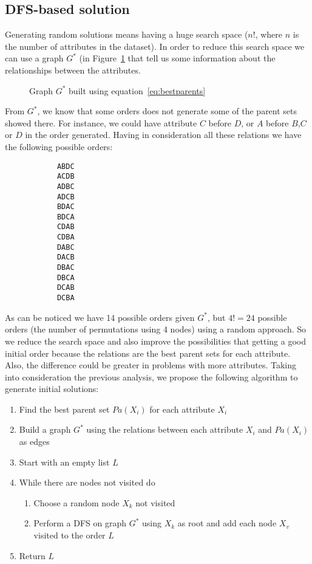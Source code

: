 \subsection{DFS-based solution}
\label{subsec:dfsapproach}
	Generating random solutions means having a huge search space ($n!$, where $n$ is the number of attributes in the dataset). In order to reduce this search space we can use a graph $G^*$ (in Figure~\ref{fig:example} that tell us some information about the relationships between the attributes.
	\begin{figure}[H]
		\centering
		
		\caption{Graph $G^*$ built using equation~\ref{eq:bestparents} }
		\label{fig:example}
	\end{figure}
	From $G^*$, we know that some orders does not generate some of the parent sets showed there. For instance, we could have attribute $C$ before $D$, or $A$ before $B$,$C$ or $D$ in the order generated. Having in consideration all these relations we have the following possible orders:
	\begin{multicols}{7}
		\begin{verbatim}
			ABDC
			ACDB
			ADBC
			ADCB
			BDAC
			BDCA
			CDAB
			CDBA
			DABC
			DACB
			DBAC
			DBCA
			DCAB
			DCBA
		\end{verbatim}
	\end{multicols}
	As can be noticed we have 14 possible orders given $G^*$, but $4! = 24$ possible orders (the number of permutations using 4 nodes) using a random approach. So we reduce the search space and also improve the possibilities that getting a good initial order because the relations are the best parent sets for each attribute. Also, the difference could be greater in problems with more attributes.
	Taking into consideration the previous analysis, we propose the following algorithm to generate initial solutions:
	\begin{enumerate}
		\item Find the best parent set ${Pa}( X_i )$ for each attribute $X_i$
		\item Build a graph $G^*$ using the relations between each attribute $X_i$ and ${Pa}( X_i )$ as edges
		\item Start with an empty list $L$
		\item While there are nodes not visited do
		\begin{enumerate}
			\item Choose a random node $X_k$ not visited
			\item Perform a DFS on graph $G^*$ using $X_k$ as root and add each node $X_v$ visited to the order $L$
		\end{enumerate}
		\item Return $L$
	\end{enumerate}
	

